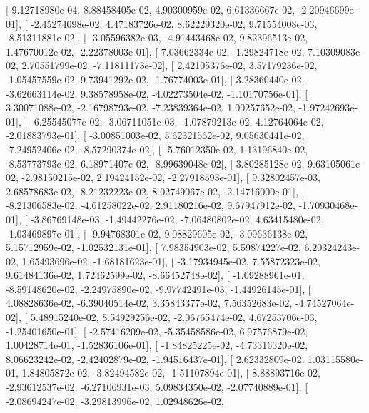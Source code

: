 \documentclass{article}
\begin{document}
       [  9.12718980e-04,   8.88458405e-02,   4.90300959e-02,
          6.61336667e-02,  -2.20946699e-01],
       [ -2.45274098e-02,   4.47183726e-02,   8.62229320e-02,
          9.71554008e-03,  -8.51311881e-02],
       [ -3.05596382e-03,  -4.91443468e-02,   9.82396513e-02,
          1.47670012e-02,  -2.22378003e-01],
       [  7.03662334e-02,  -1.29824718e-02,   7.10309083e-02,
          2.70551799e-02,  -7.11811173e-02],
       [  2.42105376e-02,   3.57179236e-02,  -1.05457559e-02,
          9.73941292e-02,  -1.76774003e-01],
       [  3.28360440e-02,  -3.62663114e-02,   9.38578958e-02,
         -4.02273504e-02,  -1.10170756e-01],
       [  3.30071088e-02,  -2.16798793e-02,  -7.23839364e-02,
          1.00257652e-02,  -1.97242693e-01],
       [ -6.25545077e-02,  -3.06711051e-03,  -1.07879213e-02,
          4.12764064e-02,  -2.01883793e-01],
       [ -3.00851003e-02,   5.62321562e-02,   9.05630441e-02,
         -7.24952406e-02,  -8.57290374e-02],
       [ -5.76012350e-02,   1.13196840e-02,  -8.53773793e-02,
          6.18971407e-02,  -8.99639048e-02],
       [  3.80285128e-02,   9.63105061e-02,  -2.98150215e-02,
          2.19424152e-02,  -2.27918593e-01],
       [  9.32802457e-03,   2.68578683e-02,  -8.21232223e-02,
          8.02749067e-02,  -2.14716000e-01],
       [ -8.21306583e-02,  -4.61258022e-02,   2.91180216e-02,
          9.67947912e-02,  -1.70930468e-01],
       [ -3.86769148e-03,  -1.49442276e-02,  -7.06480802e-02,
          4.63415480e-02,  -1.03469897e-01],
       [ -9.94768301e-02,   9.08829605e-02,  -3.09636138e-02,
          5.15712959e-02,  -1.02532131e-01],
       [  7.98354903e-02,   5.59874227e-02,   6.20324243e-02,
          1.65493696e-02,  -1.68181623e-01],
       [ -3.17934945e-02,   7.55872323e-02,   9.61484136e-02,
          1.72462599e-02,  -8.66452748e-02],
       [ -1.09288961e-01,  -8.59148620e-02,  -2.24975890e-02,
         -9.97742491e-03,  -1.44926145e-01],
       [  4.08828636e-02,  -6.39040514e-02,   3.35843377e-02,
          7.56352683e-02,  -4.74527064e-02],
       [  5.48915240e-02,   8.54929256e-02,  -2.06765474e-02,
          4.67253706e-03,  -1.25401650e-01],
       [ -2.57416209e-02,  -5.35458586e-02,   6.97576879e-02,
          1.00428714e-01,  -1.52836106e-01],
       [ -1.84825225e-02,  -4.73316320e-02,   8.06623242e-02,
         -2.42402879e-02,  -1.94516437e-01],
       [  2.62332809e-02,   1.03115580e-01,   1.84805872e-02,
         -3.82494582e-02,  -1.51107894e-01],
       [  8.88893716e-02,  -2.93612537e-02,  -6.27106931e-03,
          5.09834350e-02,  -2.07740889e-01],
       [ -2.08694247e-02,  -3.29813996e-02,   1.02948626e-02,
\end{document}
